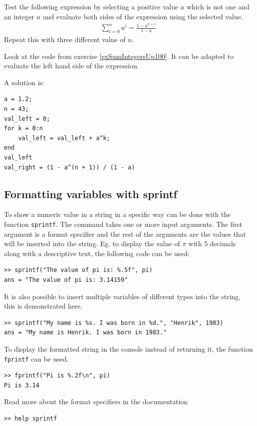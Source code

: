 \begin{ex}
Test the following expression by selecting a positive value $a$
which is not one and an integer $n$
and evaluate both sides of the expression using the selected value.
\begin{align*}
\sum_{i = 0}^n a^i = \frac{1 - a^{n + 1}}{1 - a}
\end{align*}
Repeat this with three different value of $n$.
\begin{hint}
Look at the code from exercise \ref{exSumIntegersUp100}.
It can be adapted to evaluate the left hand side of the expression.
\end{hint}
\begin{sol}
A solution is:
\begin{lstlisting}
a = 1.2;
n = 43;
val_left = 0;
for k = 0:n
    val_left = val_left + a^k;
end
val_left
val_right = (1 - a^(n + 1)) / (1 - a)
\end{lstlisting}
\end{sol}
\end{ex}




\subsection{Formatting variables with sprintf}

To show a numeric value in a string in a specific way can be 
done with the function \verb!sprintf!.
The command takes one or more input arguments.
The first argument is a format specifier and the rest
of the arguments are the values that will be inserted 
into the string.
Eg. to display the value of $\pi$ with 5 decimals
along with a descriptive text, the following code 
can be used:
\begin{lstlisting}
>> sprintf("The value of pi is: %.5f", pi)
ans = "The value of pi is: 3.14159"
\end{lstlisting}
It is also possible to insert multiple variables
of different types into the string, this is demonstrated 
here.
\begin{lstlisting}
>> sprintf("My name is %s. I was born in %d.", "Henrik", 1983)
ans = "My name is Henrik. I was born in 1983."
\end{lstlisting}
To display the formatted string in the console
instead of returning it, the function
\verb!fprintf! can be used.
\begin{lstlisting}
>> fprintf("Pi is %.2f\n", pi)
Pi is 3.14
\end{lstlisting}
Read more about the format specifiers in the documentation
\begin{lstlisting}
>> help sprintf
\end{lstlisting}




